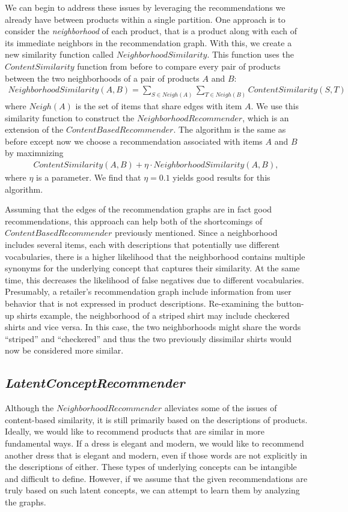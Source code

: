 \documentclass[11pt]{article}
\begin{document}
We can begin to address these issues by leveraging the recommendations we
already have between products within a single partition. One approach is to
consider the {\em neighborhood} of each product, that is a product along with
each of its immediate neighbors in the recommendation graph. With this, we
create a new similarity function called $NeighborhoodSimilarity$. This function
uses the $ContentSimilarity$ function from before to compare every pair of
products between the two neighborhoods of a pair of products $A$ and $B$:
\begin{align}
NeighborhoodSimilarity(A, B) = \sum\limits_{S\in
Neigh(A)}\sum\limits_{T\in Neigh(B)}
ContentSimilarity(S, T) 
\end{align}
where $Neigh(A)$ is the set of items that share edges with item $A$. We use this
similarity function to construct the $NeighborhoodRecommender$, which is
an extension of the $ContentBasedRecommender$. The algorithm is the same as
before except now we choose a recommendation associated with items $A$ and $B$
by maximnizing
\begin{align}
ContentSimilarity(A,B) + \eta \cdot NeighborhoodSimilarity(A, B),
\end{align}
where $\eta$ is a parameter. We find that $\eta = 0.1$ yields good results for
this algorithm.

Assuming that the edges of the recommendation graphs are in fact good
recommendations, this approach can help both of the shortcomings of
$ContentBasedRecommender$ previously mentioned. Since a neighborhood includes
several items, each with descriptions that potentially use different
vocabularies, there is a higher likelihood that the neighborhood contains
multiple synonyms for the underlying concept that captures their similarity. At
the same time, this decreases the likelihood of false negatives due to different
vocabularies. Presumably, a retailer's recommendation graph include information
from user behavior that is not expressed in product descriptions. Re-examining
the button-up shirts example, the neighborhood of a striped shirt may include
checkered shirts and vice versa.  In this case, the two neighborhoods might
share the words ``striped'' and ``checkered'' and thus the two previously
dissimilar shirts would now be considered more similar.

\subsection*{\em LatentConceptRecommender}
Although the $NeighborhoodRecommender$ alleviates some of the issues of 
content-based similarity, it is still primarily based on the descriptions of
products. Ideally, we would like to recommend products that are similar in more
fundamental ways. If a dress is elegant and modern, we would like to recommend 
another dress that is elegant and modern, even if those words are not explicitly
in the descriptions of either. These types of underlying concepts can be 
intangible and difficult to define. However, if we assume that the given
recommendations are truly based on such latent concepts, we can attempt to learn 
them by analyzing the graphs.
\end{document}
